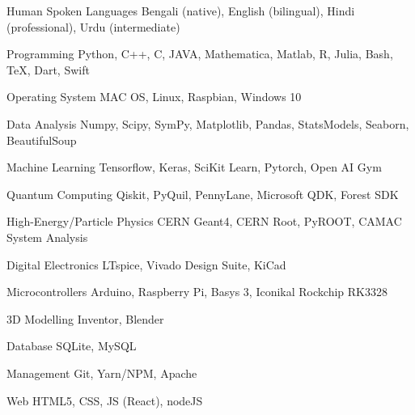 
\begin{cvskills}

    \cvskill
    {Human Spoken Languages}
    {Bengali (native), English (bilingual), Hindi (professional), Urdu (intermediate)}

    \cvskill
    {Programming}
    {Python, C++, C, JAVA, Mathematica, Matlab, R, Julia, Bash, \TeX, Dart, Swift}

    \cvskill
    {Operating System}
    {MAC OS, Linux, Raspbian, Windows 10}

    \cvskill
    {Data Analysis}
    {Numpy, Scipy, SymPy, Matplotlib, Pandas, StatsModels, Seaborn, BeautifulSoup}


    \cvskill
    {Machine Learning}
    {Tensorflow, Keras, SciKit Learn, Pytorch, Open AI Gym}


    \cvskill
    {Quantum Computing}
    {Qiskit, PyQuil, PennyLane, Microsoft QDK, Forest SDK}

    \cvskill
    {High-Energy/Particle Physics}
    {CERN Geant4, CERN Root, PyROOT, CAMAC System Analysis}

    \cvskill
    {Digital Electronics}
    {LTspice, Vivado Design Suite, KiCad}

    \cvskill
    {Microcontrollers}
    {Arduino, Raspberry Pi, Basys 3, Iconikal Rockchip RK3328}

    \cvskill
    {3D Modelling}
    {Inventor, Blender}

    \cvskill
    {Database}
    {SQLite, MySQL}

    \cvskill
    {Management}
    {Git, Yarn/NPM, Apache}

    \cvskill
    {Web}
    {HTML5, CSS, JS (React), nodeJS}

\end{cvskills}

